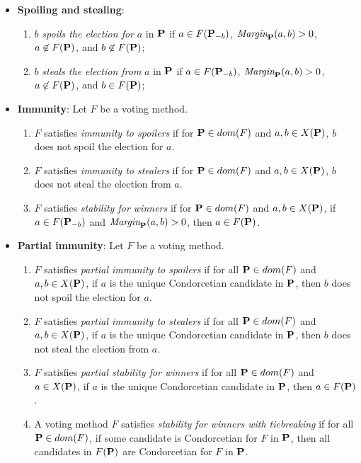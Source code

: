 \begin{definition}
    \begin{itemize}
        \item \textbf{Spoiling and stealing}:
        \begin{enumerate}
            \item $b$ \emph{spoils the election for} $a$ in $\mathbf{P}$ if $a \in F (\mathbf{P}_{-b})$, $\textit{Margin}_{\mathbf{P}}(a, b) > 0$, $a \not \in  F (\mathbf{P})$, and $b \not \in F(\mathbf{P})$;
            \item $b$ \emph{steals the election from} $a$ in $\mathbf{P}$ if $a \in F (\mathbf{P}_{-b})$, $\textit{Margin}_{\mathbf{P}}(a, b) > 0$, $a \not \in  F (\mathbf{P})$, and $b \in F(\mathbf{P})$;
        \end{enumerate}
        \item \textbf{Immunity}: Let $F$ be a voting method.
        \begin{enumerate}
            \item $F$ satisfies \emph{immunity to spoilers} if for $\mathbf{P} \in dom(F)$ and $a, b \in X(\mathbf{P})$, $b$ does not spoil the election for $a$.
            \item $F$ satisfies \emph{immunity to stealers} if for $\mathbf{P} \in dom(F)$ and $a, b \in X(\mathbf{P})$, $b$ does not steal the election from $a$.
            \item $F$ satisfies \emph{stability for winners} if for $\mathbf{P} \in dom(F)$ and $a, b \in X(\mathbf{P})$, if $a \in F (\mathbf{P}_{-b})$ and $\textit{Margin}_{\mathbf{P}}(a, b) > 0$, then $a \in F(\mathbf{P})$.
        \end{enumerate}
        \item \textbf{Partial immunity}: Let $F$ be a voting method. 
        \begin{enumerate}
            \item $F$ satisfies \emph{partial immunity to spoilers} if for all $\mathbf{P} \in dom(F)$ and $a, b \in X(\mathbf{P})$, if $a$ is the unique Condorcetian candidate in $\mathbf{P}$, then $b$ does not spoil the election for $a$.
            \item $F$ satisfies \emph{partial immunity to stealers} if for all $\mathbf{P} \in dom(F)$ and $a, b \in X(\mathbf{P})$, if $a$ is the unique Condorcetian candidate in $\mathbf{P}$, then $b$ does not steal the election from $a$.
            \item $F$ satisfies \emph{partial stability for winners} if for all $\mathbf{P} \in dom(F)$ and $a \in X(\mathbf{P})$, if $a$ is the unique Condorcetian candidate in $\mathbf{P}$, then $a \in F(\mathbf{P})$.
            \item A voting method $F$ satisfies \emph{stability for winners with tiebreaking} if for all $\mathbf{P} \in dom(F)$, if some candidate is Condorcetian for $F$ in $\mathbf{P}$, then all candidates in $F (\mathbf{P})$ are Condorcetian for $F$ in $\mathbf{P}$.
        \end{enumerate}
    \end{itemize}
\end{definition}